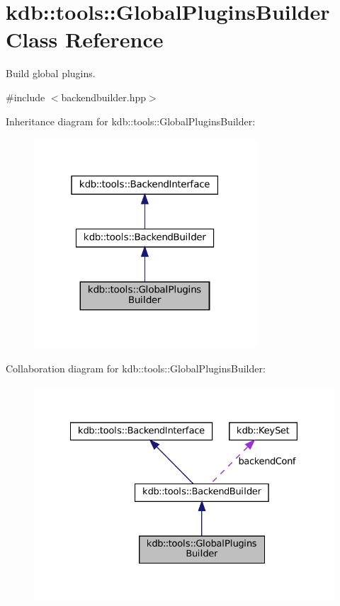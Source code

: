 \hypertarget{classkdb_1_1tools_1_1GlobalPluginsBuilder}{}\section{kdb\+::tools\+::Global\+Plugins\+Builder Class Reference}
\label{classkdb_1_1tools_1_1GlobalPluginsBuilder}


Build global plugins.  




{\ttfamily \#include $<$backendbuilder.\+hpp$>$}



Inheritance diagram for kdb\+::tools\+::Global\+Plugins\+Builder\+:
\nopagebreak
\begin{figure}[H]
\begin{center}
\leavevmode
\includegraphics[width=235pt]{classkdb_1_1tools_1_1GlobalPluginsBuilder__inherit__graph}
\end{center}
\end{figure}


Collaboration diagram for kdb\+::tools\+::Global\+Plugins\+Builder\+:
\nopagebreak
\begin{figure}[H]
\begin{center}
\leavevmode
\includegraphics[width=328pt]{classkdb_1_1tools_1_1GlobalPluginsBuilder__coll__graph}
\end{center}
\end{figure}
